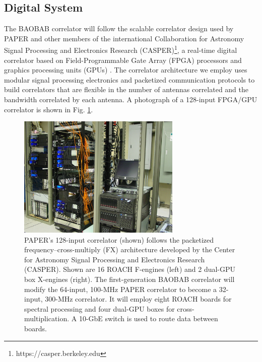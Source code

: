 \documentclass[10pt,iop]{emulateapj}
\begin{document}
\subsection{Digital System}

The BAOBAB correlator will follow the 
scalable correlator design used by PAPER and
other members of the international Collaboration for Astronomy Signal
Processing and Electronics Research (CASPER)\footnote{https://casper.berkeley.edu}, a real-time digital correlator
based on Field-Programmable Gate Array (FPGA) processors and graphics processing units (GPUs)
\citep{parsons_et_al_2008,clark_et_al_2011}.
The correlator architecture we employ uses modular
signal processing electronics and packetized communication protocols to
build correlators that are flexible in the number of antennas correlated and
the bandwidth correlated by each antenna.
A photograph of a 128-input FPGA/GPU correlator is shown in Fig. \ref{fig:correlator}.
\begin{figure}\centering
\includegraphics[height=2.3in]{roach_gpu_correlator.jpg}
\caption{
PAPER's 128-input correlator (shown) follows the packetized frequency--cross-multiply (FX)
architecture developed by the Center for Astronomy Signal Processing and
Electronics Research (CASPER).  Shown are 16 ROACH F-engines (left)
and 2 dual-GPU box X-engines (right).  The first-generation BAOBAB correlator will
modify the 64-input, 100-MHz PAPER correlator to become a 32-input,
300-MHz correlator.  It will employ eight ROACH boards for spectral processing
and four dual-GPU boxes for cross-multiplication.  A 10-GbE switch is used to
route data between boards.
} \label{fig:correlator}
\end{figure}
\end{document}
